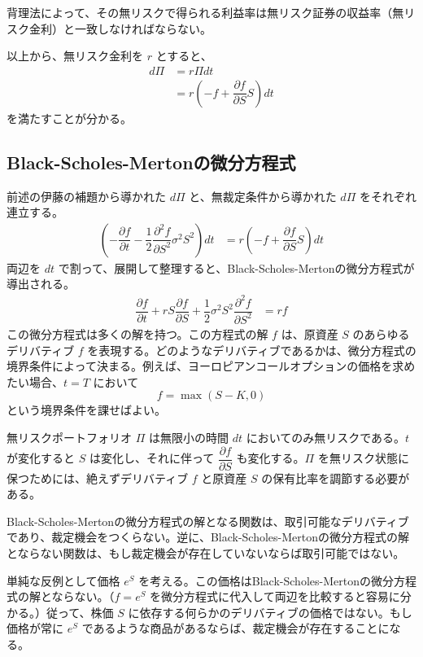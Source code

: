 \documentclass[uplatex]{jsarticle}
\begin{document}
背理法によって、その無リスクで得られる利益率は無リスク証券の収益率（無リスク金利）と一致しなければならない。

以上から、無リスク金利を $r$ とすると、
\begin{align}
	d \Pi & = r \Pi dt                                                   \\
	      & = r \left( - f + \dfrac{\partial f}{\partial S} S \right) dt
\end{align}
を満たすことが分かる。

\subsection{Black-Scholes-Mertonの微分方程式}

前述の伊藤の補題から導かれた $d \Pi$ と、無裁定条件から導かれた $d \Pi$ をそれぞれ連立する。
\begin{align}
	\left( - \dfrac{\partial f}{\partial t} - \dfrac{1}{2} \dfrac{\partial^{2} f}{\partial S^{2}} \sigma^{2} S^{2} \right) dt & = r \left( - f + \dfrac{\partial f}{\partial S} S \right) dt
\end{align}
両辺を $dt$ で割って、展開して整理すると、Black-Scholes-Mertonの微分方程式が導出される。
\begin{align}
	\dfrac{\partial f}{\partial t} + rS \dfrac{\partial f}{\partial S} + \dfrac{1}{2} \sigma^{2} S^{2} \dfrac{\partial^{2} f}{\partial S^{2}} & = rf
\end{align}
この微分方程式は多くの解を持つ。この方程式の解 $f$ は、原資産 $S$ のあらゆるデリバティブ $f$ を表現する。どのようなデリバティブであるかは、微分方程式の境界条件によって決まる。例えば、ヨーロピアンコールオプションの価格を求めたい場合、$t=T$ において
$$
	f = \max (S-K,0)
$$
という境界条件を課せばよい。

\bigskip

無リスクポートフォリオ $\Pi$ は無限小の時間 $dt$ においてのみ無リスクである。$t$ が変化すると $S$ は変化し、それに伴って $\dfrac{\partial f}{\partial S}$ も変化する。$\Pi$ を無リスク状態に保つためには、絶えずデリバティブ $f$ と原資産 $S$ の保有比率を調節する必要がある。

\bigskip

Black-Scholes-Mertonの微分方程式の解となる関数は、取引可能なデリバティブであり、裁定機会をつくらない。逆に、Black-Scholes-Mertonの微分方程式の解とならない関数は、もし裁定機会が存在していないならば取引可能ではない。

単純な反例として価格 $e^{S}$ を考える。この価格はBlack-Scholes-Mertonの微分方程式の解とならない。（$f = e^{S}$ を微分方程式に代入して両辺を比較すると容易に分かる。）従って、株価 $S$ に依存する何らかのデリバティブの価格ではない。もし価格が常に $e^{S}$ であるような商品があるならば、裁定機会が存在することになる。
\end{document}
